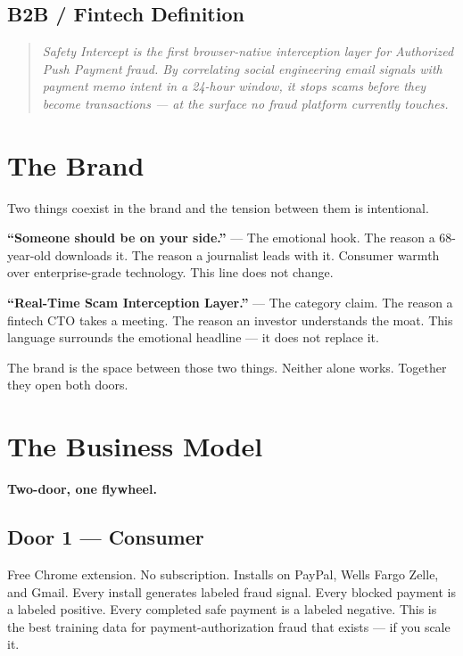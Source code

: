 \documentclass[12pt, letterpaper]{article}
\begin{document}
\subsection{B2B / Fintech Definition}

\begin{quote}
\textit{Safety Intercept is the first browser-native interception layer for Authorized Push Payment fraud. By correlating social engineering email signals with payment memo intent in a 24-hour window, it stops scams before they become transactions --- at the surface no fraud platform currently touches.}
\end{quote}

\section{The Brand}

Two things coexist in the brand and the tension between them is intentional.

\textbf{``Someone should be on your side.''} --- The emotional hook. The reason a 68-year-old downloads it. The reason a journalist leads with it. Consumer warmth over enterprise-grade technology. This line does not change.

\textbf{``Real-Time Scam Interception Layer.''} --- The category claim. The reason a fintech CTO takes a meeting. The reason an investor understands the moat. This language surrounds the emotional headline --- it does not replace it.

The brand is the space between those two things. Neither alone works. Together they open both doors.

\section{The Business Model}

\textbf{Two-door, one flywheel.}

\subsection{Door 1 --- Consumer}

Free Chrome extension. No subscription. Installs on PayPal, Wells Fargo Zelle, and Gmail. Every install generates labeled fraud signal. Every blocked payment is a labeled positive. Every completed safe payment is a labeled negative. This is the best training data for payment-authorization fraud that exists --- if you scale it.
\end{document}
